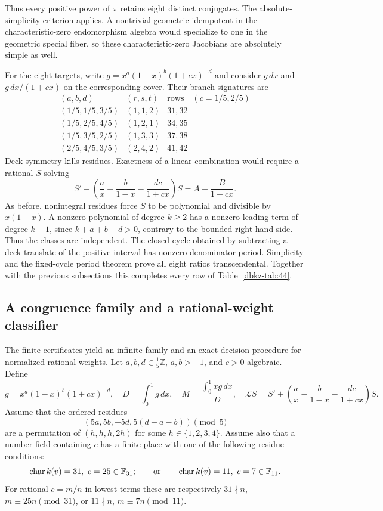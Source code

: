 \documentclass[11pt,a4paper]{article}
\theoremstyle{definition}
\theoremstyle{remark}
\numberwithin{equation}{section}
\begin{document}
Thus every positive power of $\pi$ retains eight distinct conjugates.
The absolute-simplicity criterion
\cite[Proposition 3 and Lemma 4]{dbkz-hz} applies. A nontrivial
geometric idempotent in the characteristic-zero endomorphism algebra
would specialize to one in the geometric special fiber, so these
characteristic-zero Jacobians are absolutely simple as well.

For the eight targets, write
$g=x^a(1-x)^b(1+cx)^{-d}$ and consider $g\,dx$ and
$g\,dx/(1+cx)$ on the corresponding cover. Their branch signatures
are
\[
\begin{array}{c|c|c}
(a,b,d)&(r,s,t)&\text{rows}\quad(c=1/5,2/5)\\\hline
(1/5,1/5,3/5)&(1,1,2)&31,32\\
(1/5,2/5,4/5)&(1,2,1)&34,35\\
(1/5,3/5,2/5)&(1,3,3)&37,38\\
(2/5,4/5,3/5)&(2,4,2)&41,42
\end{array}
\]
Deck symmetry kills residues. Exactness of a linear combination would
require a rational $S$ solving
\[
 S'+\left(\frac ax-\frac b{1-x}-\frac{dc}{1+cx}\right)S
       =A+\frac B{1+cx}.
\]
As before, nonintegral residues force $S$ to be polynomial and divisible
by $x(1-x)$. A nonzero polynomial of degree $k\ge2$ has a nonzero
leading term of degree $k-1$, since $k+a+b-d>0$, contrary to the
bounded right-hand side. Thus the classes are independent. The closed
cycle obtained by subtracting a deck translate of the positive interval
has nonzero denominator period. Simplicity and the fixed-cycle period
theorem prove all eight ratios transcendental. Together with the
previous subsections this completes every row of Table~\ref{dbkz-tab:44}.

\subsection{A congruence family and a rational-weight classifier}
\label{dbkz-sec:classifier}
The finite certificates yield an infinite family and an exact decision
procedure for normalized rational weights. Let
$a,b,d\in\frac15\mathbb Z$, $a,b>-1$, and $c>0$ algebraic. Define
\[
 g=x^a(1-x)^b(1+cx)^{-d},\quad D=\int_0^1g\,dx,\quad
 M=\frac{\int_0^1xg\,dx}{D},\quad
 \mathcal LS=S'+\left(\frac ax-\frac b{1-x}-\frac{dc}{1+cx}\right)S.
\]
Assume that the ordered residues
\begin{equation}\label{dbkz-eq:signature}
 (5a,5b,-5d,5(d-a-b))\pmod5
\end{equation}
are a permutation of $(h,h,h,2h)$ for some $h\in\{1,2,3,4\}$.
Assume also that a number field containing $c$ has a finite place with
one of the following residue conditions:
\begin{equation}\label{dbkz-eq:congruence}
 \operatorname{char}k(v)=31,\ \bar c=25\in\mathbb F_{31};
 \qquad\hbox{or}\qquad
 \operatorname{char}k(v)=11,\ \bar c=7\in\mathbb F_{11}.
\end{equation}
For rational $c=m/n$ in lowest terms these are respectively
$31\nmid n$, $m\equiv25n\pmod{31}$, or
$11\nmid n$, $m\equiv7n\pmod{11}$.
\end{document}
